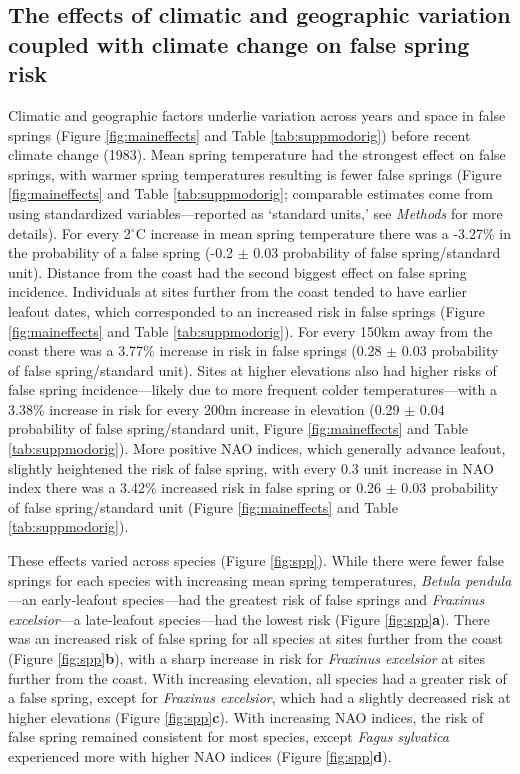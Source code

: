\documentclass{article}\usepackage[]{graphicx}\usepackage[]{color}
\begin{document}
\subsection*{The effects of climatic and geographic variation coupled with climate change on false spring risk}
Climatic and geographic factors underlie variation across years and space in false springs (Figure \ref{fig:maineffects} and Table \ref{tab:suppmodorig}) before recent climate change (1983). Mean spring temperature had the strongest effect on false springs, with warmer spring temperatures resulting is fewer false springs (Figure \ref{fig:maineffects} and Table \ref{tab:suppmodorig}; comparable estimates come from using standardized variables---reported as `standard units,' see \textit{Methods} for more details). For every 2$^{\circ}$C increase in mean spring temperature there was a -3.27\% in the probability of a false spring (-0.2 $\pm$ 0.03 probability of false spring/standard unit). Distance from the coast had the second biggest effect on false spring incidence. Individuals at sites further from the coast tended to have earlier leafout dates, which corresponded to an increased risk in false springs (Figure \ref{fig:maineffects} and Table \ref{tab:suppmodorig}). For every 150km away from the coast there was a 3.77\% increase in risk in false springs (0.28 $\pm$ 0.03 probability of false spring/standard unit). Sites at higher elevations also had higher risks of false spring incidence---likely due to more frequent colder temperatures---with a 3.38\% increase in risk for every 200m increase in elevation (0.29 $\pm$ 0.04 probability of false spring/standard unit, Figure \ref{fig:maineffects} and Table \ref{tab:suppmodorig}). More positive NAO indices, which generally advance leafout, slightly heightened the risk of false spring, with every 0.3 unit increase in NAO index there was a 3.42\% increased risk in false spring or 0.26 $\pm$ 0.03 probability of false spring/standard unit (Figure \ref{fig:maineffects} and Table \ref{tab:suppmodorig}).  

These effects varied across species (Figure \ref{fig:spp}). While there were fewer false springs for each species with increasing mean spring temperatures,  \textit{Betula pendula}---an early-leafout species---had the greatest risk of false springs and \textit{Fraxinus excelsior}---a late-leafout species---had the lowest risk (Figure \ref{fig:spp}\textbf{a}). There was an increased risk of false spring for all species at sites further from the coast (Figure \ref{fig:spp}\textbf{b}), with a sharp increase in risk for \textit{Fraxinus excelsior} at sites further from the coast. With increasing elevation, all species had a greater risk of a false spring, except for \textit{Fraxinus excelsior}, which had a slightly decreased risk at higher elevations (Figure \ref{fig:spp}\textbf{c}).  With increasing NAO indices, the risk of false spring remained consistent for most species, except \textit{Fagus sylvatica} experienced more with higher NAO indices (Figure \ref{fig:spp}\textbf{d}). 
\end{document}
